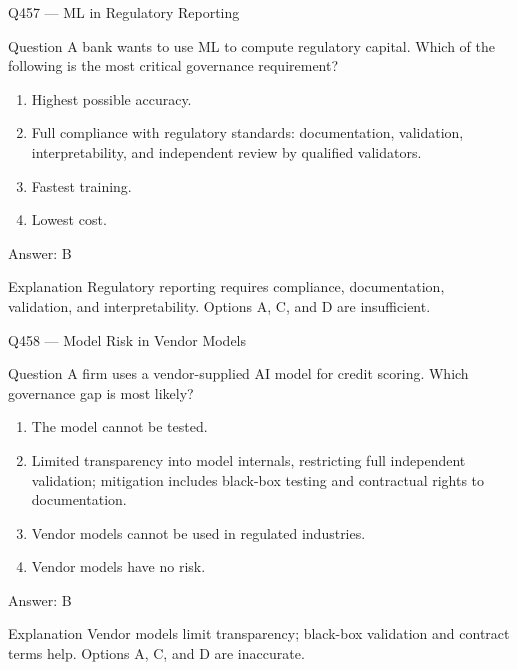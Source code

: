 \documentclass[aspectratio=169,8pt]{beamer}
\begin{document}
	\begin{frame}{Q457 --- ML in Regulatory Reporting}
		\begin{block}{Question}
			A bank wants to use ML to compute regulatory capital. Which of the following is the most critical governance requirement?
			\begin{enumerate}
				\item Highest possible accuracy.
				\item Full compliance with regulatory standards: documentation, validation, interpretability, and independent review by qualified validators.
				\item Fastest training.
				\item Lowest cost.
			\end{enumerate}
		\end{block}
		\begin{exampleblock}{Answer: B}\end{exampleblock}
		\begin{block}{Explanation}
			Regulatory reporting requires compliance, documentation, validation, and interpretability. Options A, C, and D are insufficient.
		\end{block}
	\end{frame}
	
	\begin{frame}{Q458 --- Model Risk in Vendor Models}
		\begin{block}{Question}
			A firm uses a vendor-supplied AI model for credit scoring. Which governance gap is most likely?
			\begin{enumerate}
				\item The model cannot be tested.
				\item Limited transparency into model internals, restricting full independent validation; mitigation includes black-box testing and contractual rights to documentation.
				\item Vendor models cannot be used in regulated industries.
				\item Vendor models have no risk.
			\end{enumerate}
		\end{block}
		\begin{exampleblock}{Answer: B}\end{exampleblock}
		\begin{block}{Explanation}
			Vendor models limit transparency; black-box validation and contract terms help. Options A, C, and D are inaccurate.
		\end{block}
	\end{frame}
	
\end{document}
